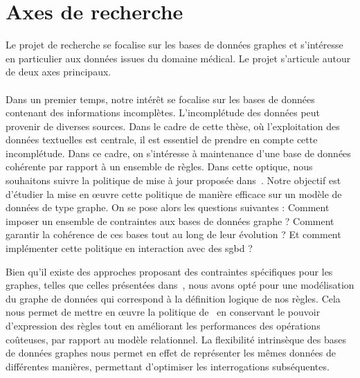 \section{Axes de recherche}

Le projet de recherche se focalise sur les bases de données graphes et s'intéresse en particulier aux données issues du domaine médical.
Le projet s'articule autour de deux axes principaux.

\paragraph{}
Dans un premier temps, notre intérêt se focalise sur les bases de données contenant des informations incomplètes.
L'incomplétude des données peut provenir de diverses sources.
Dans le cadre de cette thèse, où l'exploitation des données textuelles est centrale, il est essentiel de prendre en compte cette incomplétude.
Dans ce cadre, on s'intéresse à maintenance d'une base de données cohérente par rapport à un ensemble de règles.
Dans cette optique, nous souhaitons suivre la politique de mise à jour proposée dans~\cite{chabinConsistentUpdatingDatabases2020}.
Notre objectif est d'étudier la mise en œuvre cette politique de manière efficace sur un modèle de données de type graphe.
On se pose alors les questions suivantes : Comment imposer un ensemble de contraintes aux bases de données graphe ? Comment garantir la cohérence de ces bases tout au long de leur évolution ? Et comment implémenter cette politique en interaction avec des \gls{sgbd} ?

Bien qu'il existe des approches proposant des contraintes spécifiques pour les graphes, telles que celles présentées dans~\cite{fanDependenciesGraphs2019}, nous avons opté pour une modélisation du graphe de données qui correspond à la définition logique de nos règles.
Cela nous permet de mettre en œuvre la politique de~\cite{chabinConsistentUpdatingDatabases2020} en conservant le pouvoir d'expression des règles tout en améliorant les performances des opérations coûteuses, par rapport au modèle relationnel.
La flexibilité intrinsèque des bases de données graphes nous permet en effet de représenter les mêmes données de différentes manières, permettant d'optimiser les interrogations subséquentes.

